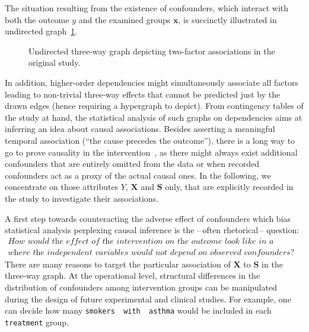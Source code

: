 \documentclass[10pt]{article}
\newcommand{\equ}[1]{\begin{gather} #1 \end{gather}}
\begin{document}
The situation resulting from the existence of confounders, which interact with both the outcome $y$ and the examined groups $\boldsymbol x$, is succinctly illustrated in undirected graph~\ref{graph:ThreePoint_disparity}.
%
\begin{figure}[!t]
%
\centering
{}
\caption{Undirected three-way graph depicting two-factor associations in the original study.}\label{graph:ThreePoint_disparity}
\end{figure}
In addition, higher-order dependencies might simultaneously associate  all factors leading to non-trivial three-way effects that cannot be predicted just by the drawn edges (hence requiring a hypergraph to depict). 
%
From contingency tables of the study at hand, the statistical analysis of such graphs on dependencies aims at inferring  an idea about causal associations. Besides asserting a meaningful temporal association (``the cause precedes the outcome''), there is a long way to go to prove causality in the intervention~\cite{greenland1999confounding}, as there might always exist additional confounders that are entirely omitted from the data or when recorded confounders act as a proxy of the actual causal ones. In the following, we concentrate on those attributes $Y$, $\boldsymbol X$ and $\boldsymbol S$ only, that are explicitly  recorded in the study to investigate their associations. %

A first step towards counteracting  the adverse effect of confounders which bias statistical analysis  perplexing causal inference is the --\,often rhetorical\,-- question:
\equ{
\label{hypotheticalQ}
\textit{How would the effect of the intervention on the outcome  look like in a hypothetical scenario}
\nonumber
\\
\textit{where the independent variables would not depend on observed confounders?}
}
%
There are many reasons to target the particular association of $\boldsymbol X$ to $\boldsymbol S$ in the three-way graph.
At the operational level, structural differences in the distribution of confounders among intervention groups can be manipulated~\cite{vanderweele2019principles} during the design of future experimental and clinical studies. For example, one can decide how many \texttt{smokers\,\,with\,\,asthma} would be included in each \texttt{treatment} group. 
\end{document}
